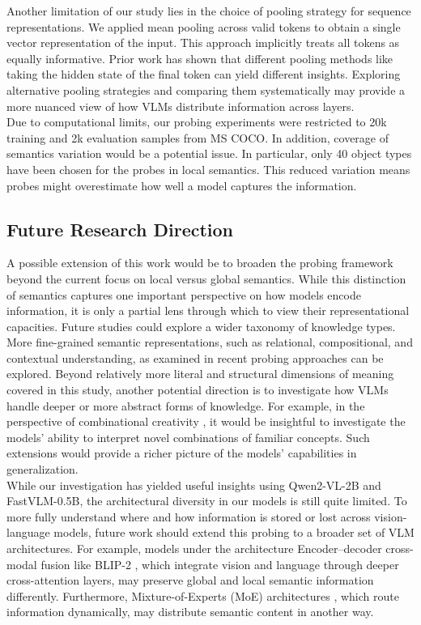 \documentclass[11pt]{article}
\begin{document}
Another limitation of our study lies in the choice of pooling strategy for sequence representations.
We applied mean pooling across valid tokens to obtain a single vector representation of the input. This approach implicitly treats all tokens as equally informative.
Prior work \cite{tang2024PoolingAndAttention} has shown that different pooling methods like taking the hidden state of the final token can yield different insights. Exploring alternative pooling strategies and comparing them systematically may provide a more nuanced view of how VLMs distribute information across layers. \\

Due to computational limits, our probing experiments were restricted to 20k training and 2k evaluation samples from MS COCO.
In addition, coverage of semantics variation would be a potential issue.
In particular, only 40 object types have been chosen for the probes in local semantics.
This reduced variation means probes might overestimate how well a model captures the information.

\subsection{Future Research Direction}
A possible extension of this work would be to broaden the probing framework beyond the current focus on local versus global semantics.
While this distinction of semantics captures one important perspective on how models encode information, it is only a partial lens through which to view their representational capacities.
Future studies could explore a wider taxonomy of knowledge types.
More fine-grained semantic representations, such as relational, compositional, and contextual understanding, as examined in recent probing approaches \cite{schiappa2023ProbingConceptualUnderstanding} can be explored.
Beyond relatively more literal and structural dimensions of meaning covered in this study, another potential direction is to investigate how VLMs handle deeper or more abstract forms of knowledge.
For example, in the perspective of combinational creativity \cite{peng2025ProbingandInducingCombinationalCreativity}, it would be insightful to investigate the models' ability to interpret novel combinations of familiar concepts. Such extensions would provide a richer picture of the models’ capabilities in generalization. \\
While our investigation has yielded useful insights using Qwen2-VL-2B and FastVLM-0.5B, the architectural diversity in our models is still quite limited.
To more fully understand where and how information is stored or lost across vision-language models, future work should extend this probing to a broader set of VLM architectures.
For example, models under the architecture Encoder–decoder cross-modal fusion like BLIP-2 \cite{li2023BLIP2}, which integrate vision and language through deeper cross-attention layers, may preserve global and local semantic information differently.
Furthermore, Mixture-of-Experts (MoE) architectures \cite{lin2024MoELLaVA}, which route information dynamically, may distribute semantic content in another way.
\end{document}
